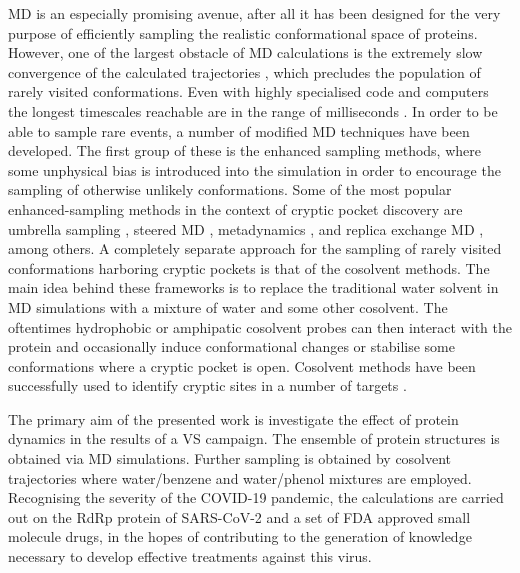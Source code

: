 MD is an especially promising avenue, after all it has been designed for the very purpose of efficiently sampling the realistic conformational space of proteins. However, one of the largest obstacle of MD calculations is the extremely slow convergence of the calculated trajectories \cite{ensemble_discovery}, which precludes the population of rarely visited conformations. Even with highly specialised code and computers the longest timescales reachable are in the range of milliseconds \cite{anton}. In order to be able to sample rare events, a number of modified MD techniques have been developed. The first group of these is the enhanced sampling methods, where some unphysical bias is introduced into the simulation in order to encourage the sampling of otherwise unlikely conformations. Some of the most popular enhanced-sampling methods in the context of cryptic pocket discovery are umbrella sampling \cite{umbrella}, steered MD \cite{steered_md}, metadynamics \cite{metadynamics}, and replica exchange MD \cite{replica_exchange}, among others. A completely separate approach for the sampling of rarely visited conformations harboring cryptic pockets is that of the cosolvent methods. The main idea behind these frameworks is to replace the traditional water solvent in MD simulations with a mixture of water and some other cosolvent.
The oftentimes hydrophobic or amphipatic cosolvent probes can then interact with the protein and occasionally induce conformational changes or stabilise some conformations where a cryptic pocket is open.
Cosolvent methods have been successfully used to identify cryptic sites in a number of targets \cite{cosolvent_framework,cosolvent_md,cosolvent_based,cryptic_review}.

The primary aim of the presented work is investigate the effect of protein dynamics in the results of a VS campaign. The ensemble of protein structures is obtained via MD simulations. Further sampling is obtained by cosolvent trajectories where water/benzene and water/phenol mixtures are employed. Recognising the severity of the COVID-19 pandemic, the calculations are carried out on the RdRp protein of SARS-CoV-2 and a set of FDA approved small molecule drugs, in the hopes of contributing to the generation of knowledge necessary to develop effective treatments against this virus. 